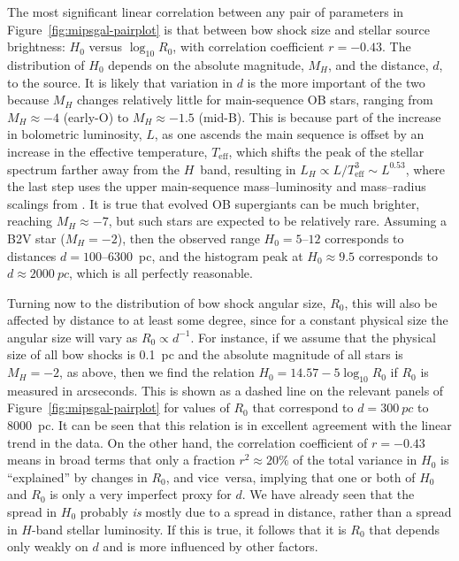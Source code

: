 \documentclass[useAMS, usenatbib, a4paper]{mnras}
\begin{document}
The most significant linear correlation between any pair of parameters
in Figure~\ref{fig:mipsgal-pairplot} is that between bow shock size
and stellar source brightness: \(H_0\) versus \(\log_{10} R_0\), with
correlation coefficient \(r = -0.43\).  The distribution of \(H_0\)
depends on the absolute magnitude, \(M_H\), and the distance, \(d\),
to the source.  It is likely that variation in \(d\) is the more
important of the two because \(M_H\) changes relatively little for
main-sequence OB stars, ranging from \(M_H \approx -4\) (early-O) to
\(M_H \approx -1.5\) (mid-B).  This is because part of the increase in
bolometric luminosity, \(L\), as one ascends the main sequence is
offset by an increase in the effective temperature,
\(T_{\text{eff}}\), which shifts the peak of the stellar spectrum
farther away from the \(H\)~band, resulting in
\(L_H \propto L / T_{\text{eff}}^3 \sim L^{0.53}\), where the last step uses
the upper main-sequence mass--luminosity and mass--radius scalings from
\citet{Eker:2015a}. It is true that evolved OB supergiants can be much
brighter, reaching \(M_H \approx -7\), but such stars are expected to be
relatively rare.  Assuming a B2V star (\(M_H = -2\)), then the
observed range \(H_0 = 5\)--\(12\) corresponds to distances
\(d = 100\)--\SI{6300}{pc}, and the histogram peak at
\(H_0 \approx 9.5\) corresponds to \(d \approx \SI{2000}{pc}\), which is all
perfectly reasonable.

Turning now to the distribution of bow shock angular size, \(R_0\),
this will also be affected by distance to at least some degree, since
for a constant physical size the angular size will vary as
\(R_0 \propto d^{-1}\).  For instance, if we assume that the physical size
of all bow shocks is \SI{0.1}{pc} and the absolute magnitude of all
stars is \(M_H = -2\), as above, then we find the relation
\(H_0 = 14.57 - 5 \log_{10} R_0\) if \(R_0\) is measured in
arcseconds. This is shown as a dashed line on the relevant panels of
Figure~\ref{fig:mipsgal-pairplot} for values of \(R_0\) that
correspond to \(d = \SI{300}{pc}\) to \SI{8000}{pc}.  It can be seen
that this relation is in excellent agreement with the linear trend in
the data. On the other hand, the correlation coefficient of
\(r = -0.43\) means in broad terms that only a fraction
\(r^2 \approx 20\%\) of the total variance in \(H_0\) is ``explained'' by
changes in \(R_0\), and vice~versa, implying that one or both of
\(H_0\) and \(R_0\) is only a very imperfect proxy for \(d\).  We have
already seen that the spread in \(H_0\) probably \emph{is} mostly due
to a spread in distance, rather than a spread in \(H\)-band stellar
luminosity.  If this is true, it follows that it is \(R_0\) that
depends only weakly on \(d\) and is more influenced by other factors.
\end{document}

